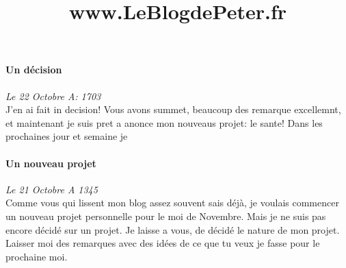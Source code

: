\documentclass{article}
\begin{document}
\title{www.LeBlogdePeter.fr}

\paragraph{Un décision} \emph{Le 22 Octobre A: 1703}\\
J'en ai fait in decision!  Vous avons summet, beaucoup des remarque excellemnt, et maintenant je suis pret a anonce mon nouveaus projet: le sante! Dans les prochaines jour et semaine je 

\paragraph{Un nouveau projet} \emph{Le 21 Octobre A 1345} \\
Comme vous qui lissent mon blog assez souvent sais déjà, je voulais commencer un nouveau projet personnelle pour le moi de Novembre. Mais je ne suis pas encore décidé sur un projet. Je laisse a vous, de décidé le nature de mon projet. Laisser moi des remarques avec des idées de ce que tu veux je fasse pour le prochaine moi.
\end{document}
